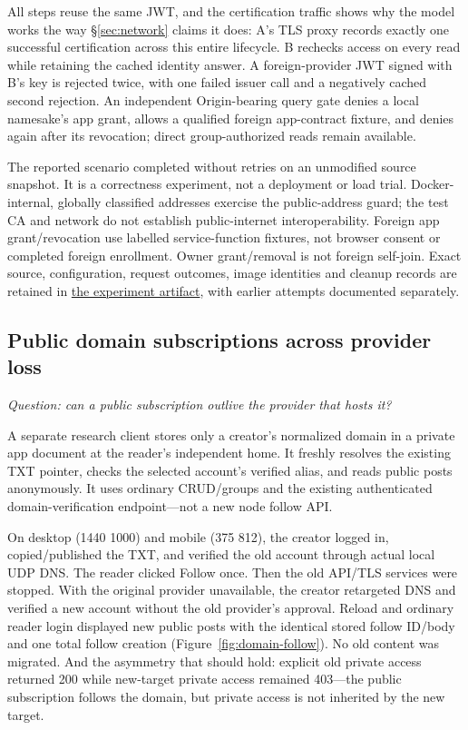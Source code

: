 \documentclass[sigconf, nonacm]{acmart}
\newcommand{\artifactbase}{https://github.com/jacoby149/web10}
\newcommand{\domainartifactrev}{26720acba859c7eb03fc5d26a6221cdde5b764a1}
\newcommand{\domainartifactdir}[2]{\href{\artifactbase/tree/\domainartifactrev/#1}{#2}}
\begin{document}
All steps reuse the same JWT, and the certification traffic shows why the
model works the way \S\ref{sec:network} claims it does: A's TLS proxy records
exactly one successful certification across this entire lifecycle. B
rechecks access on every read while retaining the cached identity answer. A
foreign-provider JWT signed with B's key is rejected twice, with one failed
issuer call and a negatively cached second rejection. An independent
Origin-bearing query gate denies a local namesake's app grant, allows a
qualified foreign app-contract fixture, and denies again after its
revocation; direct group-authorized reads remain available.

The reported scenario completed without retries on an unmodified source
snapshot. It is a correctness experiment, not a deployment or load trial.
Docker-internal, globally classified addresses exercise the public-address
guard; the test CA and network do not establish public-internet
interoperability. Foreign app grant/revocation use labelled service-function
fixtures, not browser consent or completed foreign enrollment. Owner
grant/removal is not foreign self-join. Exact source, configuration, request
outcomes, image identities and cleanup records are retained in
\domainartifactdir{research/federation-demo}{the experiment artifact}, with
earlier attempts documented separately.

\subsection{Public domain subscriptions across provider loss}
\label{sec:domain-results}

\emph{Question: can a public subscription outlive the provider that hosts
it?}

A separate research client stores only a creator's normalized domain in a
private app document at the reader's independent home. It freshly resolves
the existing TXT pointer, checks the selected account's verified alias, and
reads public posts anonymously. It uses ordinary CRUD/groups and the existing
authenticated domain-verification endpoint---not a new node follow API.

On desktop (1440\,\texttimes\,1000) and mobile (375\,\texttimes\,812), the
creator logged in, copied/published the TXT, and verified the old account
through actual local UDP DNS. The reader clicked Follow once. Then the old
API/TLS services were stopped. With the original provider unavailable, the
creator retargeted DNS and verified a new account without the old provider's
approval. Reload and ordinary reader login displayed new public posts with
the identical stored follow ID/body and one total follow creation
(Figure~\ref{fig:domain-follow}). No old content was migrated. And the
asymmetry that should hold: explicit old private access returned 200 while
new-target private access remained 403---the public subscription follows the
domain, but private access is not inherited by the new target.
\end{document}
